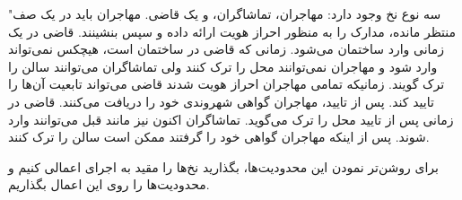 \documentclass{book}
\begin{document}
    "سه نوع نخ وجود دارد: مهاجران، تماشاگران، و یک قاضی. مهاجران باید در یک صف منتظر مانده، مدارک را به منظور احراز هویت ارائه داده  و سپس بنشینند. 
    قاضی در یک زمانی وارد ساختمان می‌شود. زمانی که قاضی در ساختمان است، هیچکس نمی‌تواند وارد شود و مهاجران نمی‌توانند محل را ترک کنند ولی 
    تماشاگران می‌توانند سالن را ترک گویند. زمانیکه تمامی مهاجران احراز هویت شدند قاضی می‌تواند تابعیت آن‌ها را تایید کند. پس از تایید، مهاجران 
    گواهی شهروندی خود را دریافت می‌کنند. قاضی در زمانی پس از تایید محل را ترک می‌گوید. تماشاگران اکنون نیز مانند قبل می‌توانند وارد شوند. 
    پس از اینکه مهاجران گواهی‌ خود را گرفتند ممکن است سالن را ترک کنند. 

    برای روشن‌تر نمودن این محدودیت‌ها، بگذارید نخ‌ها را مقید به اجرای    اعمالی کنیم و محدودیت‌ها را روی این اعمال بگذاریم. 
\end{document}

